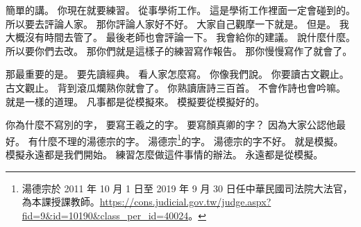 \hypertarget{w01:cue:1637}{}簡單的講。
\hypertarget{w01:cue:1638}{}你現在就要練習。
\hypertarget{w01:cue:1639}{}從事學術工作。
\hypertarget{w01:cue:1640}{}這是學術工作裡面一定會碰到的。
\hypertarget{w01:cue:1641}{}所以要去評論人家。
\hypertarget{w01:cue:1642}{}那你評論人家好不好。
\hypertarget{w01:cue:1643}{}大家自己觀摩一下就是。
\hypertarget{w01:cue:1644}{}但是。
\hypertarget{w01:cue:1645}{}我大概沒有時間去管了。
\hypertarget{w01:cue:1646}{}最後老師也會評論一下。
\hypertarget{w01:cue:1647}{}我會給你的建議。
\hypertarget{w01:cue:1648}{}說什麼什麼。
\hypertarget{w01:cue:1649}{}所以要你們去改。
\hypertarget{w01:cue:1650}{}那你們就是這樣子的練習寫作報告。
\hypertarget{w01:cue:1651}{}那你慢慢寫作了就會了。

\hypertarget{w01:cue:1652}{}那最重要的是。
\hypertarget{w01:cue:1653}{}要先讀經典。
\hypertarget{w01:cue:1654}{}看人家怎麼寫。
\hypertarget{w01:cue:1655}{}你像我們說。
\hypertarget{w01:cue:1656}{}你要讀古文觀止。
\hypertarget{w01:cue:1657}{}古文觀止。
\hypertarget{w01:cue:1658}{}背到滾瓜爛熟你就會了。
\hypertarget{w01:cue:1659}{}你熟讀唐詩三百首。
\hypertarget{w01:cue:1660}{}不會作詩也會吟嘛。
\hypertarget{w01:cue:1661}{}就是一樣的道理。
\hypertarget{w01:cue:1662}{}凡事都是從模擬來。
\hypertarget{w01:cue:1663}{}模擬要從模擬好的。

\hypertarget{w01:cue:1664}{}你為什麼不寫別的字，
\hypertarget{w01:cue:1665}{}要寫王羲之的字。
\hypertarget{w01:cue:1666}{}要寫顏真卿的字？
\hypertarget{w01:cue:1667}{}因為大家公認他最好。
\hypertarget{w01:cue:1668}{}有什麼不理的湯德宗的字。
\hypertarget{w01:cue:1669}{}湯德宗\footnote{湯德宗於 2011 年 10 月 1 日至 2019 年 9 月 30 日任中華民國司法院大法官，為本課授課教師。\url{https://cons.judicial.gov.tw/judge.aspx?fid=9&id=10190&class_per_id=40024}。}的字。
\hypertarget{w01:cue:1670}{}湯德宗的字不好。
\hypertarget{w01:cue:1671}{}就是模擬。
\hypertarget{w01:cue:1672}{}模擬永遠都是我們開始。
\hypertarget{w01:cue:1673}{}練習怎麼做這件事情的辦法。
\hypertarget{w01:cue:1674}{}永遠都是從模擬。

